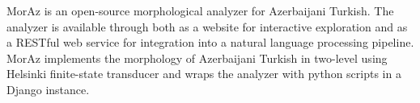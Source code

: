 MorAz is an open-source morphological analyzer for Azerbaijani Turkish. The analyzer is available through both as a website for interactive exploration and as a RESTful web service for integration into a natural language processing pipeline. MorAz implements the morphology of Azerbaijani Turkish in two-level using Helsinki finite-state transducer and wraps the analyzer with python scripts in a Django instance.
